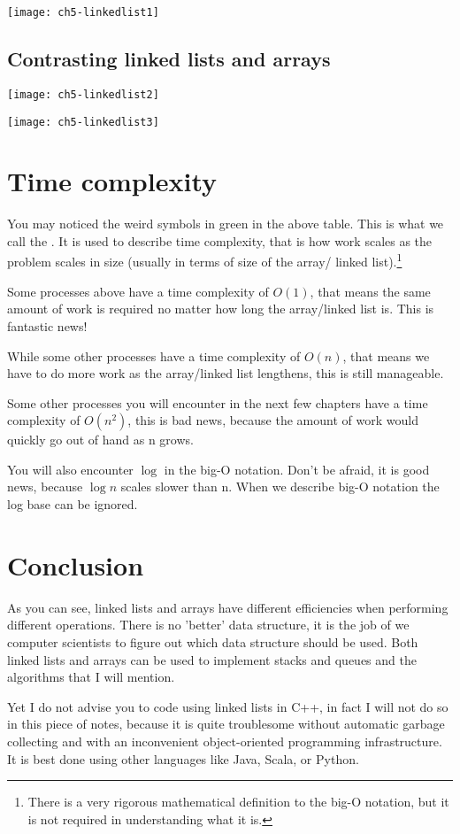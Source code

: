 \texttt{[image: ch5-linkedlist1]}

\subsection{Contrasting linked lists and arrays}

\texttt{[image: ch5-linkedlist2]}

\texttt{[image: ch5-linkedlist3]}

\section{Time complexity}

You may noticed the weird symbols in green in the above table. This is what we call the \textbf{}. It is used to describe time complexity, that is how work scales as the problem scales in size (usually in terms of size of the array/ linked list).\footnote{There is a very rigorous mathematical definition to the big-O notation, but it is not required in understanding what it is.}

Some processes above have a time complexity of $O(1)$, that means the same amount of work is required no matter how long the array/linked list is. This is fantastic news! 

While some other processes have a time complexity of $O(n)$, that means we have to do more work as the array/linked list lengthens, this is still manageable. 

Some other processes you will encounter in the next few chapters have a time complexity of $O(n^2)$, this is bad news, because the amount of work would quickly go out of hand as n grows.

You will also encounter $\log$ in the big-O notation. Don't be afraid, it is good news, because $\log n$ scales slower than n. When we describe big-O notation the log base can be ignored.

\section{Conclusion}
As you can see, linked lists and arrays have different efficiencies when performing different operations. There is no 'better' data structure, it is the job of we computer scientists to figure out which data structure should be used. Both linked lists and arrays can be used to implement stacks and queues and the algorithms that I will mention. 

Yet I do not advise you to code using linked lists in C++, in fact I will not do so in this piece of notes, because it is quite troublesome without automatic garbage collecting and with an inconvenient object-oriented programming infrastructure. It is best done using other languages like Java, Scala, or Python.

